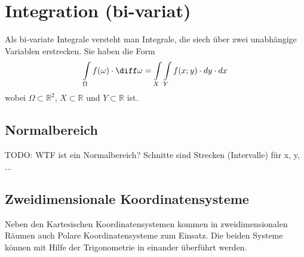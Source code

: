 \newpage
\section{Integration (bi-variat)}
Als bi-variate Integrale versteht man Integrale, die siech über zwei unabhängige Variablen erstrecken.
Sie haben die Form
\[
    \int\limits_{\Omega} f(\omega)\cdot \diff \omega =\int\limits_{X} \int\limits_{Y} f(x;y) \cdot dy \cdot dx
\]
wobei $ \Omega \subset \mathbb{R}^2 $, $ X \subset \mathbb{R} $ und $ Y \subset \mathbb{R} $ ist.

\subsection{Normalbereich}

TODO: WTF ist ein Normalbereich?
Schnitte sind Strecken (Intervalle) für x, y, ...

\subsection{Zweidimensionale Koordinatensysteme}
Neben den Kartesischen Koordinatensystemen kommen in zweidimensionalen Räumen auch Polare Koordinatensysteme zum Einsatz.
Die beiden Systeme können mit Hilfe der Trigonometrie in einander überführt werden.

